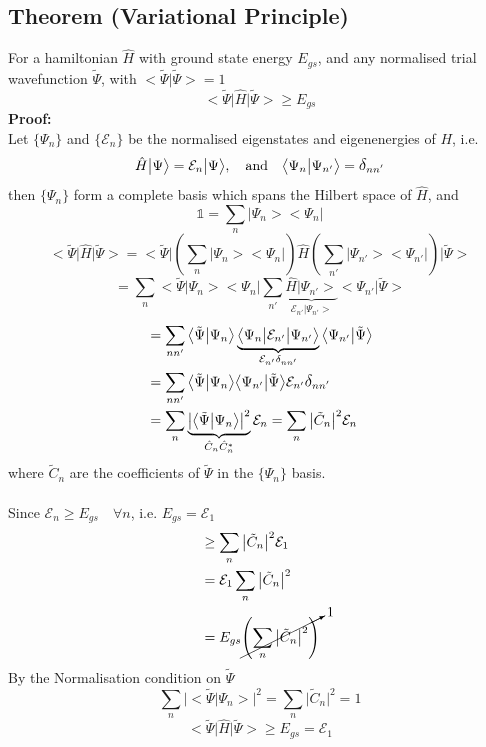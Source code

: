 \documentclass[12pt,fancychapters]{report}
\numberwithin{equation}{section}
\begin{document}
\subsection{Theorem (Variational Principle)}
For a hamiltonian $\hat{H}$ with ground state energy $E_{gs}$, and any normalised trial
wavefunction $\tilde{\Psi}$, with $\big<\tilde{\Psi}\big|\tilde{\Psi}\big> = 1$
\[
  \big<\tilde{\Psi}\big|\hat{H}\big|\tilde{\Psi} \big> \geq E_{gs}
\]
\textbf{Proof:}\\
Let $\{\Psi_n\}$ and $\{\mathcal{E}_n\}$ be the normalised eigenstates and eigenenergies of $H$, 
i.e. 
\[
  \hat{H}\big|\Psi\big> = \mathcal{E}_n\big|\Psi\big>, \quad \text{and}\quad \big<\Psi_n\big|
  \Psi_{n'}\big> = \mathlarger{\delta}_{nn'}
\]
then $\{\Psi_n \}$ form a complete basis which spans the Hilbert space of $\hat{H}$, and 
\[
  \mathbb{1} = \sum_{n}\big|\Psi_n\big>\big<\Psi_n\big|
\]
\[
  \big<\tilde{\Psi}\big|\hat{H}\big|\tilde{\Psi}\big> = \bigg<\tilde{\Psi}\bigg|\left(
  \sum_n \big|\Psi_n\big>\big<\Psi_n\big|\right)\hat{H}\left(\sum_{n'}
  \big|\Psi_{n'}\big>\big<\Psi_{n'}\big| \right)\bigg|\tilde{\Psi}\bigg>
\]
\[
  = \sum_n \big<\tilde{\Psi}\big|\Psi_n \big>\big<\Psi_n\big|\sum_{n'}
  \underbrace{\hat{H}\big|\Psi_{n'}
  \big>}_{\mathcal{E}_{n'}\big|\Psi_{n'}\big>} \big<\Psi_{n'}\big|\tilde{\Psi}\big>
\]
\begin{align*}
 & =\sum_{nn'}\big<\tilde{\Psi}\big|\Psi_n\big>\underbrace{\big<\Psi_{n}\big|\mathcal{E}_{n'}
    \big|\Psi_{n'}
  \big>}_{\mathcal{E}_{n'}\delta_{nn'}} \big<\Psi_{n'}\big|\tilde{\Psi}\big>\\
 &=\sum_{nn'}\big<\tilde{\Psi}\big|\Psi_n \big>\big<\Psi_{n'}\big|\tilde{\Psi} \big>
  \mathcal{E}_{n'}\mathlarger{\delta}_{nn'}\\
 &= \sum_{n}\underbrace{\big|\big<\tilde{\Psi}\big|\Psi_n \big>\big|^2}_{\hat{C}_n \hat{C}_n^*}
 \mathcal{E}_n = \sum_{n}\big|\tilde{C}_n\big|^2\mathcal{E}_n
\end{align*}
where $\tilde{C}_n$ are the coefficients of $\tilde{\Psi}$ in the $\{\Psi_n\}$ basis.\\
\\
Since $\mathcal{E}_n \geq E_{gs}\quad \forall n$, i.e. $E_{gs} = \mathcal{E}_1$
\begin{align*}
  &\geq \sum_{n}\big|\tilde{C}_n\big|^2\mathcal{E}_1\\
  &= \mathcal{E}_1\sum_{n}\big|\tilde{C}_n\big|^2\\
  &= E_{gs}\cancelto{1}{\left(\sum_{n}\big|\tilde{C}_n\big|^2 \right)}
\end{align*}
By the Normalisation condition on $\tilde{\Psi}$
\[
  \sum_n \big|\big<\tilde{\Psi}\big|\Psi_n\big>\big|^2 = \sum_{n}\big|\tilde{C}_n\big|^2 = 1
\]
\[
  \big<\tilde{\Psi}\big|\hat{H}\big|\tilde{\Psi} \big> \geq E_{gs} = \mathcal{E}_1
\]
\end{document}
